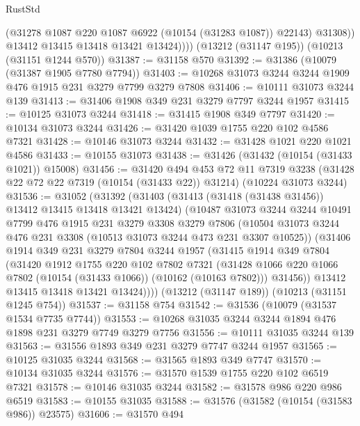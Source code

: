 \begin{lexlean}{RustStd}
\begin{coremodule}
                (@31278 @1087 @220 @1087 @6922 (@10154 (@31283 @1087)) @22143)
                @31308))
            @13412
            @13415
            @13418
            @13421
            @13424))))
    (@13212 (@31147 @195))
    (@10213 (@31151 @1244 @570))
@31387 := @31158 @570
@31392 := @31386 (@10079 (@31387 @1905 @7780 @7794))
@31403 := @10268 @31073 @3244 @3244 @1909 @476 @1915 @231 @3279 @7799 @3279 @7808
@31406 := @10111 @31073 @3244 @139
@31413 := @31406 @1908 @349 @231 @3279 @7797 @3244 @1957
@31415 := @10125 @31073 @3244
@31418 := @31415 @1908 @349 @7797
@31420 := @10134 @31073 @3244
@31426 := @31420 @1039 @1755 @220 @102 @4586 @7321
@31428 := @10146 @31073 @3244
@31432 := @31428 @1021 @220 @1021 @4586
@31433 := @10155 @31073
@31438 := @31426 (@31432 (@10154 (@31433 @1021)) @15008)
@31456 := @31420
    @494
    @453
    @72
    @11
    @7319
    @3238
    (@31428 @22 @72 @22 @7319 (@10154 (@31433 @22)) @31214)
    (@10224 @31073 @3244)
@31536 := @31052
    (@31392
      (@31403
        (@31413 (@31418 (@31438 @31456)) @13412 @13415 @13418 @13421 @13424)
        (@10487
          @31073
          @3244
          @3244
          @10491
          @7799
          @476
          @1915
          @231
          @3279
          @3308
          @3279
          @7806
          (@10504 @31073 @3244 @476 @231 @3308 (@10513 @31073 @3244 @473 @231 @3307 @10525))
          (@31406
            @1914
            @349
            @231
            @3279
            @7804
            @3244
            @1957
            (@31415
              @1914
              @349
              @7804
              (@31420
                @1912
                @1755
                @220
                @102
                @7802
                @7321
                (@31428 @1066 @220 @1066 @7802 (@10154 (@31433 @1066)) (@10162 (@10163 @7802)))
                @31456))
            @13412
            @13415
            @13418
            @13421
            @13424))))
    (@13212 (@31147 @189))
    (@10213 (@31151 @1245 @754))
@31537 := @31158 @754
@31542 := @31536 (@10079 (@31537 @1534 @7735 @7744))
@31553 := @10268 @31035 @3244 @3244 @1894 @476 @1898 @231 @3279 @7749 @3279 @7756
@31556 := @10111 @31035 @3244 @139
@31563 := @31556 @1893 @349 @231 @3279 @7747 @3244 @1957
@31565 := @10125 @31035 @3244
@31568 := @31565 @1893 @349 @7747
@31570 := @10134 @31035 @3244
@31576 := @31570 @1539 @1755 @220 @102 @6519 @7321
@31578 := @10146 @31035 @3244
@31582 := @31578 @986 @220 @986 @6519
@31583 := @10155 @31035
@31588 := @31576 (@31582 (@10154 (@31583 @986)) @23575)
@31606 := @31570
    @494

\end{coremodule}
\end{lexlean}
